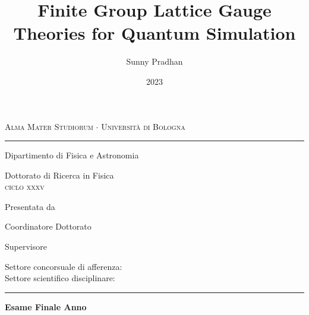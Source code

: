 
\title{Finite Group Lattice Gauge Theories for Quantum Simulation}
\author{Sunny Pradhan}
\date{2023}
\cosupervisor{}

\begin{titlingpage}
    \setlength{\parindent}{0pt}
    \begin{center}
        \textsc{\Large Alma Mater Studiorum $\cdot$ Universit\`a di Bologna}
        \rule[0.5ex]{\linewidth}{2pt}
        Dipartimento di Fisica e Astronomia

        \vspace*{25pt}
        {\LARGE Dottorato di Ricerca in Fisica}\\[2pt]
        \textsc{ciclo xxxv}
    \end{center}

    \vspace{1.5cm}

    \begin{center}
        \Huge\thetitle
    \end{center}

    \vspace{3cm}

    \large
    \linespread{1.2}
    Presentata da\\
    \textbf{\theauthor}

    \vspace{1.2cm}

    \begin{minipage}[t]{0.47\textwidth}\large
        Coordinatore Dottorato\\
        \textbf{\thephdcoordinator}
    \end{minipage}
    \hfill
    \begin{minipage}[t]{0.47\textwidth}\raggedleft\large
        Supervisore\\
        \textbf{\thesupervisor}

    \end{minipage}

    \vfill
    \normalsize

    Settore concorsuale di afferenza: \ilsettoreconcorsuale \\
    Settore scientifico disciplinare: \ilsettoredisciplinare

    \rule[0.5ex]{\textwidth}{1pt}

    \vspace*{-10pt}
    \begin{center}
        \textbf{Esame Finale Anno \thedate}
    \end{center}
\end{titlingpage}

\newpage
\cleardoublepage
